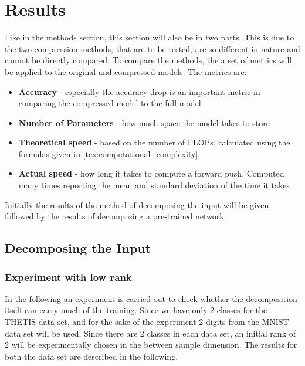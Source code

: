 \section{Results}
Like in the methods section, this section will also be in two parts. This is due to the two compression methods, that are to be tested, are so different in nature and cannot be directly compared. To compare the methods, the a set of metrics will be applied to the original and compressed models. The metrics are:
\begin{itemize}
    \item \textbf{Accuracy} - especially the accuracy drop is an important metric in comparing the compressed model to the full model
    \item \textbf{Number of Parameters} - how much space the model takes to store
    \item \textbf{Theoretical speed} - based on the number of FLOPs, calculated using the formulas given in \autoref{tex:computational_complexity}.
    \item \textbf{Actual speed} - how long it takes to compute a forward push. Computed many times reporting the mean and standard deviation of the time it takes
\end{itemize}
Initially the results of the method of decomposing the input will be given, followed by the results of decomposing a pre-trained network.

\subsection{Decomposing the Input}


\subsubsection{Experiment with low rank}
In the following an experiment is carried out to check whether the decomposition itself can carry much of the training. Since we have only 2 classes for the THETIS data set, and for the sake of the experiment 2 digits from the MNIST data set will be used. Since there are 2 classes in each data set, an initial rank of 2 will be experimentally chosen in the between sample dimension. The results for both the data set are described in the following.

